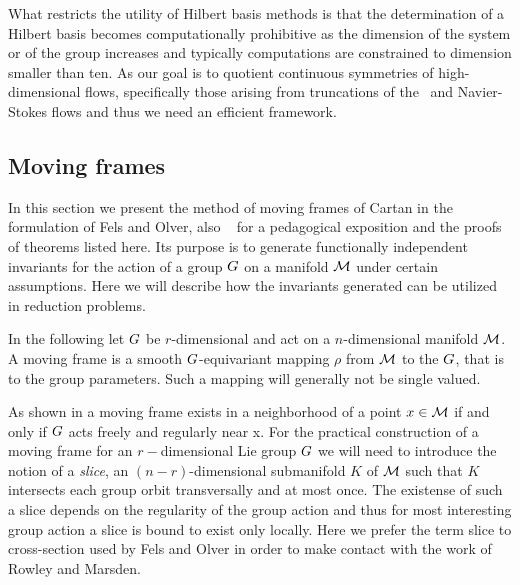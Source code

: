 What restricts the utility of Hilbert basis methods is that the
determination of a Hilbert basis becomes computationally
prohibitive as the dimension of the system or of the group
increases and typically
computations are constrained to dimension smaller than ten. As
our goal is to quotient continuous symmetries of
high-dimensional flows, specifically those arising from
truncations of the \KS\ and Navier-Stokes flows
and thus we need an efficient framework.




\subsection{Moving frames}
\label{sec:mf}

In this section we present the method of moving frames of
Cartan in the formulation of Fels and
Olver, also \cf~
for a pedagogical exposition and the proofs of theorems
listed here. Its purpose is to generate functionally
independent invariants for the action of a group $G$ on
a manifold $\mathcal{M}$ under certain assumptions. Here we will
describe how the invariants generated can be utilized in 
reduction problems.

In the following let $G$ be $r$-dimensional and act on a
$n$-dimensional manifold $\mathcal{M}$.
A moving frame is a smooth $G$-equivariant mapping
$\rho$ from $\mathcal{M}$ to the $G$, that is to the group
parameters. Such a mapping will generally not be single valued.      

As shown in  a moving frame exists 
in a neighborhood of a point $x\in\mathcal{M}$ if and only if 
$G$ acts freely and regularly  near x. For the practical
construction of a moving frame for an $r-$dimensional Lie group
$G$ we will need to introduce the
notion of a \emph{slice}, an $(n-r)$-dimensional submanifold $K$
of $\mathcal{M}$ such that $K$ intersects each group orbit
transversally and at most once. The existense of such a slice
depends on the regularity of the group action
and thus for most interesting group action a slice is bound to
exist only locally. Here we prefer the term slice to cross-section
used by Fels and Olver\rf{FelsOlver98} in order to make contact
with the work of Rowley and Marsden.

